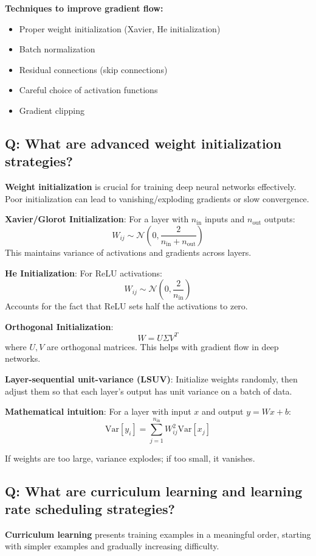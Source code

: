 \textbf{Techniques to improve gradient flow:}
\begin{itemize}
	\item Proper weight initialization (Xavier, He initialization)
	\item Batch normalization
	\item Residual connections (skip connections)
	\item Careful choice of activation functions
	\item Gradient clipping
\end{itemize}

\subsection*{Q: What are advanced weight initialization strategies?}
\textbf{Weight initialization} is crucial for training deep neural networks effectively. Poor initialization can lead to vanishing/exploding gradients or slow convergence.

\textbf{Xavier/Glorot Initialization}:
For a layer with \(n_{\text{in}}\) inputs and \(n_{\text{out}}\) outputs:
\[
W_{ij} \sim \mathcal{N}\left(0, \frac{2}{n_{\text{in}} + n_{\text{out}}}\right)
\]
This maintains variance of activations and gradients across layers.

\textbf{He Initialization}:
For ReLU activations:
\[
W_{ij} \sim \mathcal{N}\left(0, \frac{2}{n_{\text{in}}}\right)
\]
Accounts for the fact that ReLU sets half the activations to zero.

\textbf{Orthogonal Initialization}:
\[
W = U \Sigma V^T
\]
where \(U, V\) are orthogonal matrices. This helps with gradient flow in deep networks.

\textbf{Layer-sequential unit-variance (LSUV)}:
Initialize weights randomly, then adjust them so that each layer's output has unit variance on a batch of data.

\textbf{Mathematical intuition}:
For a layer with input \(x\) and output \(y = Wx + b\):
\[
\text{Var}[y_i] = \sum_{j=1}^{n_{\text{in}}} W_{ij}^2 \text{Var}[x_j]
\]

If weights are too large, variance explodes; if too small, it vanishes.

\subsection*{Q: What are curriculum learning and learning rate scheduling strategies?}
\textbf{Curriculum learning} presents training examples in a meaningful order, starting with simpler examples and gradually increasing difficulty.

